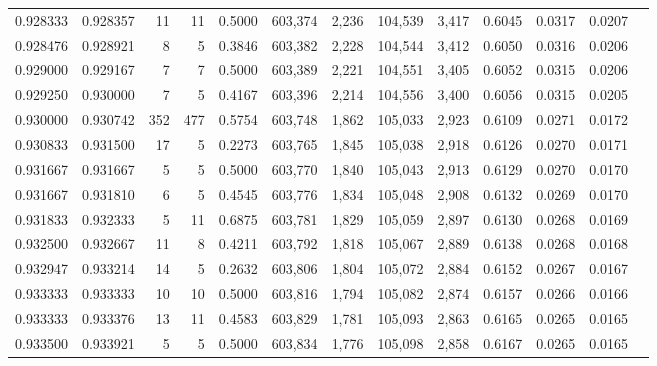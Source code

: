\begin{tabular}{rrrrrrrrrrrrr}
0.928333 & 0.928357 &    11 &  11 &                                     0.5000 & 603,374 &   2,236 & 104,539 &   3,417 & 0.6045 & 0.0317 & 0.0207 \\
0.928476 & 0.928921 &     8 &   5 &                                     0.3846 & 603,382 &   2,228 & 104,544 &   3,412 & 0.6050 & 0.0316 & 0.0206 \\
0.929000 & 0.929167 &     7 &   7 &                                     0.5000 & 603,389 &   2,221 & 104,551 &   3,405 & 0.6052 & 0.0315 & 0.0206 \\
0.929250 & 0.930000 &     7 &   5 &                                     0.4167 & 603,396 &   2,214 & 104,556 &   3,400 & 0.6056 & 0.0315 & 0.0205 \\
0.930000 & 0.930742 &   352 & 477 &                                     0.5754 & 603,748 &   1,862 & 105,033 &   2,923 & 0.6109 & 0.0271 & 0.0172 \\
0.930833 & 0.931500 &    17 &   5 &                                     0.2273 & 603,765 &   1,845 & 105,038 &   2,918 & 0.6126 & 0.0270 & 0.0171 \\
0.931667 & 0.931667 &     5 &   5 &                                     0.5000 & 603,770 &   1,840 & 105,043 &   2,913 & 0.6129 & 0.0270 & 0.0170 \\
0.931667 & 0.931810 &     6 &   5 &                                     0.4545 & 603,776 &   1,834 & 105,048 &   2,908 & 0.6132 & 0.0269 & 0.0170 \\
0.931833 & 0.932333 &     5 &  11 &                                     0.6875 & 603,781 &   1,829 & 105,059 &   2,897 & 0.6130 & 0.0268 & 0.0169 \\
0.932500 & 0.932667 &    11 &   8 &                                     0.4211 & 603,792 &   1,818 & 105,067 &   2,889 & 0.6138 & 0.0268 & 0.0168 \\
0.932947 & 0.933214 &    14 &   5 &                                     0.2632 & 603,806 &   1,804 & 105,072 &   2,884 & 0.6152 & 0.0267 & 0.0167 \\
0.933333 & 0.933333 &    10 &  10 &                                     0.5000 & 603,816 &   1,794 & 105,082 &   2,874 & 0.6157 & 0.0266 & 0.0166 \\
0.933333 & 0.933376 &    13 &  11 &                                     0.4583 & 603,829 &   1,781 & 105,093 &   2,863 & 0.6165 & 0.0265 & 0.0165 \\
0.933500 & 0.933921 &     5 &   5 &                                     0.5000 & 603,834 &   1,776 & 105,098 &   2,858 & 0.6167 & 0.0265 & 0.0165 \\

\end{tabular}
